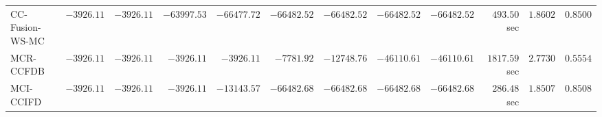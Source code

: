 \begin{table}[H]
\begin{tabular}{lrrrrrrrrrrr}
     CC-Fusion-WS-MC & $     -3926.11$ & $     -3926.11$ & $    -63997.53$ & $    -66477.72$ & $    -66482.52$ & $    -66482.52$ & $    -66482.52$ & $    -66482.52$ & $       493.50$ sec    & $       1.8602$  & $       0.8500$ \\ 
\cmidrule{1-1} 
           MCR-CCFDB & $     -3926.11$ & $     -3926.11$ & $     -3926.11$ & $     -3926.11$ & $     -7781.92$ & $    -12748.76$ & $    -46110.61$ & $    -46110.61$ & $      1817.59$ sec    & $       2.7730$  & $       0.5554$ \\ 
\cmidrule{1-1} 
           MCI-CCIFD & $     -3926.11$ & $     -3926.11$ & $     -3926.11$ & $    -13143.57$ & $    -66482.68$ & $    -66482.68$ & $    -66482.68$ & $    -66482.68$ & $       286.48$ sec    & $       1.8507$  & $       0.8508$ \\ 
\bottomrule
\end{tabular}
\end{table}

